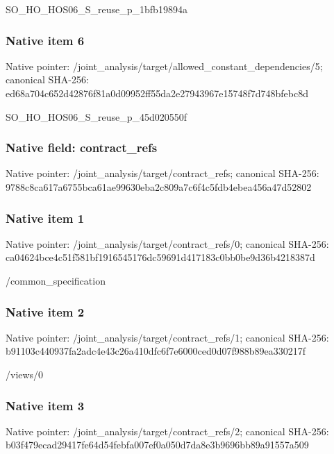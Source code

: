 \documentclass[10pt,a4paper]{article}
\begin{document}
\begingroup\raggedright\sloppy SO\_\allowbreak{}HO\_\allowbreak{}HOS06\_\allowbreak{}S\_\allowbreak{}reuse\_\allowbreak{}p\_\allowbreak{}1bfb19894a\par\endgroup

\subsubsection{Native item 6}
Native pointer: /joint\_\allowbreak{}analysis/target/allowed\_\allowbreak{}constant\_\allowbreak{}dependencies/5; canonical SHA-256: ed68a704c652d42876f81a0d09952ff55da2e27943967e15748f7d748bfebc8d

\begingroup\raggedright\sloppy SO\_\allowbreak{}HO\_\allowbreak{}HOS06\_\allowbreak{}S\_\allowbreak{}reuse\_\allowbreak{}p\_\allowbreak{}45d020550f\par\endgroup

\subsubsection{Native field: contract\_\allowbreak{}refs}
Native pointer: /joint\_\allowbreak{}analysis/target/contract\_\allowbreak{}refs; canonical SHA-256: 9788c8ca617a6755bca61ae99630eba2c809a7c6f4c5fdb4ebea456a47d52802

\subsubsection{Native item 1}
Native pointer: /joint\_\allowbreak{}analysis/target/contract\_\allowbreak{}refs/0; canonical SHA-256: ca04624bce4c51f581bf1916545176dc59691d417183c0bb0be9d36b4218387d

\begingroup\raggedright\sloppy /\allowbreak{}common\_\allowbreak{}specification\par\endgroup

\subsubsection{Native item 2}
Native pointer: /joint\_\allowbreak{}analysis/target/contract\_\allowbreak{}refs/1; canonical SHA-256: b91103c440937fa2adc4e43c26a410dfc6f7e6000ced0d07f988b89ea330217f

\begingroup\raggedright\sloppy /\allowbreak{}views/\allowbreak{}0\par\endgroup

\subsubsection{Native item 3}
Native pointer: /joint\_\allowbreak{}analysis/target/contract\_\allowbreak{}refs/2; canonical SHA-256: b03f479ecad29417fe64d54febfa007ef0a050d7da8e3b9696bb89a91557a509
\end{document}
